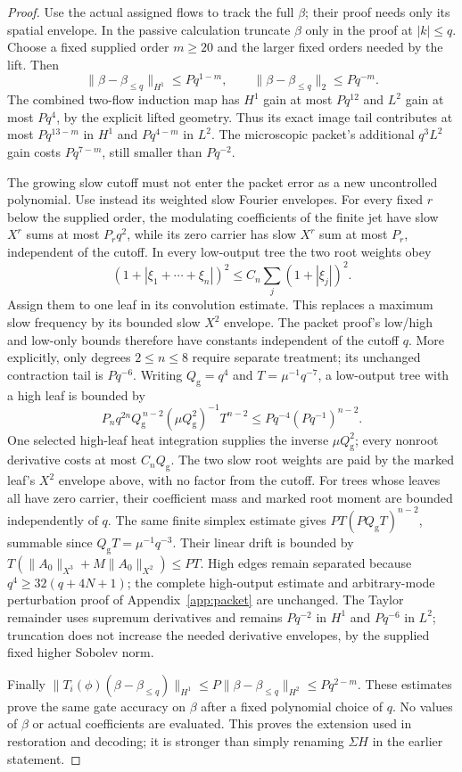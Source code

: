 \documentclass[11pt,a4paper]{amsart}
\theoremstyle{definition}
\theoremstyle{remark}
\numberwithin{equation}{section}
\newcommand{\norm}[1]{\lVert #1\rVert}
\begin{document}
\begin{proof}
Use the actual assigned flows to track the full $\beta$; their proof needs
only its spatial envelope.  In the passive calculation truncate $\beta$
only in the proof at $|k|\le q$.  Choose a fixed supplied order $m\ge20$
and the larger fixed orders needed by the lift.  Then
\[
 \norm{\beta-\beta_{\le q}}_{H^1}\le Pq^{1-m},\qquad
 \norm{\beta-\beta_{\le q}}_2\le Pq^{-m}.
\]
The combined two-flow induction map has $H^1$ gain at most $Pq^{12}$
and $L^2$ gain at most $Pq^4$, by the explicit lifted geometry.  Thus
its exact image tail contributes at most $Pq^{13-m}$ in $H^1$ and
$Pq^{4-m}$ in $L^2$.  The microscopic packet's additional $q^3L^2$
gain costs $Pq^{7-m}$, still smaller than $Pq^{-2}$.

The growing slow cutoff must not enter the packet error as a new
uncontrolled polynomial.  Use instead its weighted slow Fourier envelopes.
For every fixed $r$ below the supplied order, the modulating coefficients
of the finite jet have slow $X^r$ sums at most $P_rq^2$, while its zero
carrier has slow $X^r$ sum at most $P_r$, independent of the cutoff.
In every low-output tree the two root weights obey
\[
 (1+|\xi_1+\cdots+\xi_n|)^2
       \le C_n\sum_j(1+|\xi_j|)^2.
\]
Assign them to one leaf in its convolution estimate.  This replaces a
maximum slow frequency by its bounded slow $X^2$ envelope.  The packet
proof's low/high and low-only bounds therefore have constants independent
of the cutoff $q$. More explicitly, only degrees $2\le n\le8$ require
separate treatment; its unchanged contraction tail is $Pq^{-6}$.
Writing $Q_{\mathrm g}=q^4$ and $T=\mu^{-1}q^{-7}$, a low-output tree
with a high leaf is bounded by
\[
 P_nq^{2n}Q_{\mathrm g}^{\,n-2}
       (\mu Q_{\mathrm g}^2)^{-1}T^{n-2}
 \le Pq^{-4}(Pq^{-1})^{n-2}.
\]
One selected high-leaf heat integration supplies the inverse
$\mu Q_{\mathrm g}^2$; every nonroot derivative costs at most
$C_nQ_{\mathrm g}$. The two slow root weights are paid by the marked
leaf's $X^2$ envelope above, with no factor from the cutoff. For trees
whose leaves all have zero carrier, their coefficient mass and marked
root moment are bounded independently of $q$. The same finite simplex
estimate gives $PT(PQ_{\mathrm g}T)^{n-2}$, summable since
$Q_{\mathrm g}T=\mu^{-1}q^{-3}$. Their linear drift is bounded by
$T(\norm{A_0}_{X^3}+M\norm{A_0}_{X^2})\le PT$.
High edges remain separated because $q^4\ge32(q+4N+1)$; the complete
high-output estimate and arbitrary-mode perturbation proof of
Appendix~\ref{app:packet} are unchanged.
The Taylor remainder uses supremum derivatives and remains $Pq^{-2}$
in $H^1$ and $Pq^{-6}$ in $L^2$; truncation does not increase the needed
derivative envelopes, by the supplied fixed higher Sobolev norm.

Finally
$\norm{T_i(\phi)(\beta-\beta_{\le q})}_{H^1}
\le P\norm{\beta-\beta_{\le q}}_{H^2}\le Pq^{2-m}$.
These estimates prove the same gate accuracy on $\beta$ after a fixed
polynomial choice of $q$.  No values of $\beta$ or actual coefficients
are evaluated.  This proves the extension used in restoration and
decoding; it is stronger than simply renaming $\Sigma H$ in the earlier
statement.
\end{proof}
\end{document}
